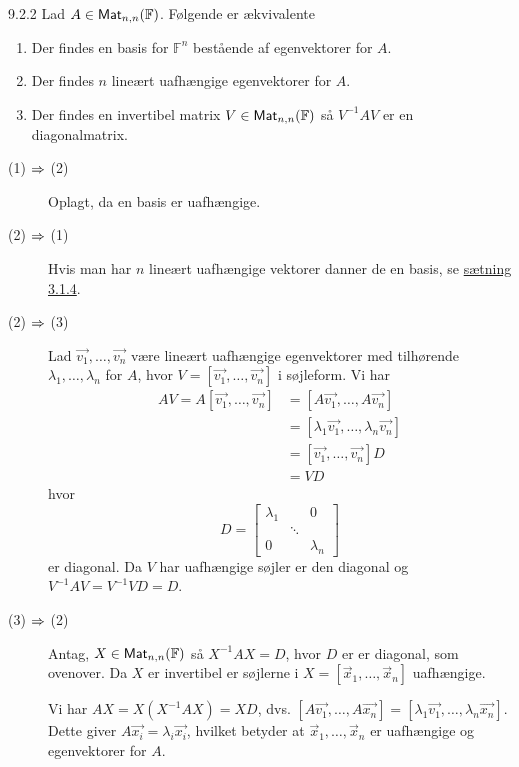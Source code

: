 %
%

\begin{lemma}{9.2.2}
	Lad $A \in \textsf{Mat}_{n,n}(\mathbb{F})$. Følgende er ækvivalente
	\begin{enumerate}[(1)]
		\item Der findes en basis for $\mathbb{F}^n$ bestående af egenvektorer
			for $A$.
		\item Der findes $n$ lineært uafhængige egenvektorer for $A$.
		\item Der findes en invertibel matrix $V \in \textsf{Mat}_{n,n}(\mathbb{F})$ så
			$V^{-1}AV$ er en diagonalmatrix.
	\end{enumerate}
\end{lemma}

\begin{bevis}
	\begin{description}
		\item[(1) $\Rightarrow$ (2)] Oplagt, da en basis er uafhængige.
		\item[(2) $\Rightarrow$ (1)] Hvis man har $n$ lineært uafhængige vektorer
			danner de en basis, se \hyperlink{3.1.4}{sætning 3.1.4}.
		\item[(2) $\Rightarrow$ (3)] Lad $\vec{v_1}, \dotsc, \vec{v_n}$ være lineært
			uafhængige egenvektorer med tilhørende $\lambda_1, \dotsc,
			\lambda_n$ for $A$, hvor $V = [\vec{v_1}, \dotsc, \vec{v_n}]$ i
			søjleform. Vi har
			\begin{align*}
				AV = A[\vec{v_1}, \dotsc, \vec{v_n}] &= [A\vec{v_1}, \dotsc,
						A\vec{v_n}] \\
					&= [\lambda_1\vec{v_1}, \dotsc, \lambda_n\vec{v_n}] \\
					&= [\vec{v_1}, \dotsc, \vec{v_n}] D \\
					&= VD
			\end{align*}
			hvor
			\[
				D = \begin{bmatrix}
					\lambda_1 & & 0 \\
					& \ddots & \\
					0 & & \lambda_n
				\end{bmatrix}
			\]
			er diagonal. Da $V$ har uafhængige søjler er den diagonal og 
			$V^{-1}AV = V^{-1}VD = D$.
		\item[(3) $\Rightarrow$ (2)] Antag, $X \in \textsf{Mat}_{n,n}(\mathbb{F})$ så
			$X^{-1}AX = D$, hvor $D$ er er diagonal, som ovenover. Da $X$ er 
			invertibel er søjlerne i $X = [\vec{x}_1, \dotsc, \vec{x}_n]$
			uafhængige.
			
			Vi har $AX = X(X^{-1}AX) = XD$, dvs. $[A\vec{v_1}, \dotsc,
			A\vec{x_n}] = [\lambda_1\vec{v_1}, \dotsc, \lambda_n\vec{x_n}]$.
			Dette giver $A\vec{x_i} = \lambda_i \vec{x_i}$, hvilket betyder
			at $\vec{x}_1, \dotsc, \vec{x}_n$ er uafhængige og egenvektorer for
			$A$.
	\end{description}
\end{bevis}
